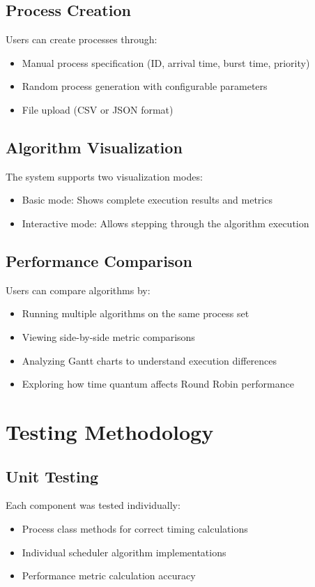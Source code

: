 \documentclass[12pt,a4paper]{report}
\begin{document}
\section{Process Creation}
Users can create processes through:
\begin{itemize}
    \item Manual process specification (ID, arrival time, burst time, priority)
    \item Random process generation with configurable parameters
    \item File upload (CSV or JSON format)
\end{itemize}

\section{Algorithm Visualization}
The system supports two visualization modes:
\begin{itemize}
    \item Basic mode: Shows complete execution results and metrics
    \item Interactive mode: Allows stepping through the algorithm execution
\end{itemize}

\section{Performance Comparison}
Users can compare algorithms by:
\begin{itemize}
    \item Running multiple algorithms on the same process set
    \item Viewing side-by-side metric comparisons
    \item Analyzing Gantt charts to understand execution differences
    \item Exploring how time quantum affects Round Robin performance
\end{itemize}

\chapter{Testing Methodology}

\section{Unit Testing}
Each component was tested individually:
\begin{itemize}
    \item Process class methods for correct timing calculations
    \item Individual scheduler algorithm implementations
    \item Performance metric calculation accuracy
\end{itemize}
\end{document}
